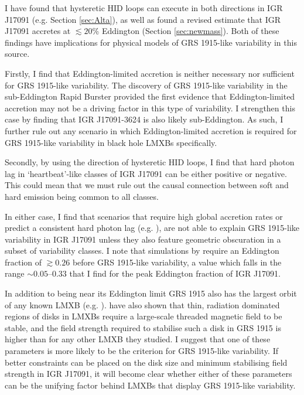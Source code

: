 \par I have found that hysteretic HID loops can execute in both directions in IGR J17091 (e.g. Section \ref{sec:Alta}), as well as found a revised estimate that IGR J17091 accretes at $\lesssim20$\% Eddington (Section \ref{sec:newmass}).  Both of these findings have implications for physical models of GRS 1915-like variability in this source.
\par Firstly, I find that Eddington-limited accretion is neither necessary nor sufficient for GRS 1915-like variability.  The discovery of GRS 1915-like variability in the sub-Eddington Rapid Burster \citep{Bagnoli_RB,Bagnoli_PopStudy} provided the first evidence that Eddington-limited accretion may not be a driving factor in this type of variability.  I strengthen this case by finding that IGR J17091-3624 is also likely sub-Eddington.  As such, I further rule out any scenario in which Eddington-limited accretion is required for GRS 1915-like variability in black hole LMXBs specifically.
\par Secondly, by using the direction of hysteretic HID loops, I find that hard photon lag in `heartbeat'-like classes of IGR J17091 can be either positive or negative.  This could mean that we must rule out the causal connection between soft and hard emission being common to all classes.
\par In either case, I find that scenarios that require high global accretion rates or predict a consistent hard photon lag (e.g. \citealp{Neilsen_GRSModel,Janiuk_Lag}), are not able to explain GRS 1915-like variability in IGR J17091 unless they also feature geometric obscuration in a subset of variability classes.  I note that simulations by \citealp{Nayakshin_GRSModel} require an Eddington fraction of $\gtrsim0.26$ before GRS 1915-like variability, a value which falls in the range $\sim0.05\mbox{--}0.33$ that I find for the peak Eddington fraction of IGR J17091.
\par In addition to being near its Eddington limit GRS 1915 also has the largest orbit of any known LMXB (e.g. \citealp{McClintock_BHBs}).  \citealp{Sadowski_MagField} have also shown that thin, radiation dominated regions of disks in LMXBs require a large-scale threaded magnetic field to be stable, and the field strength required to stabilise such a disk in GRS 1915 is higher than for any other LMXB they studied.  I suggest that one of these parameters is more likely to be the criterion for GRS 1915-like variability.  If better constraints can be placed on the disk size and minimum stabilising field strength in IGR J17091, it will become clear whether either of these parameters can be the unifying factor behind LMXBs that display GRS 1915-like variability.

